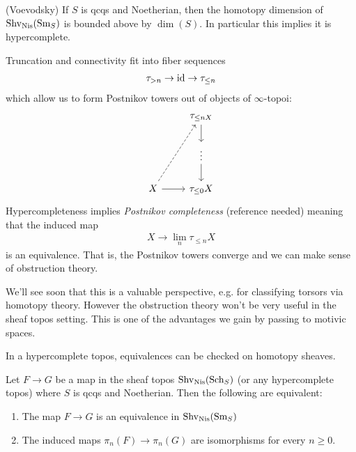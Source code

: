 \documentclass[11pt,openany]{book}
\begin{document}
\begin{theorem} (Voevodsky) If $S$ is qcqs and Noetherian, then the homotopy dimension of $\mathrm{Shv}_{\mathrm{Nis}}(\mathrm{Sm}_S)$ is bounded above by $\dim(S)$. In particular this implies it is hypercomplete.
\end{theorem}

Truncation and connectivity fit into fiber sequences
\begin{equation}\label{eqn:truncation-connectivity-fiber-seq}
\begin{aligned}
    \tau_{>n} \to \mathrm{id} \to \tau_{\le n}
\end{aligned}
\end{equation}
%
which allow us to form Postnikov towers out of objects of $\infty$-topoi:
\[ \begin{tikzcd}
    & \tau_{\le n X}\dar \\
    & \vdots\dar\\
    X\rar\ar[uur,dashed] & \tau_{\le 0} X
\end{tikzcd} \]
Hypercompleteness implies \textit{Postnikov completeness} (reference needed) meaning that the induced map
\begin{align*}
    X \to \lim_n \tau_{\le n} X
\end{align*}
is an equivalence. That is, the Postnikov towers converge and we can make sense of obstruction theory.

We'll see soon that this is a valuable perspective, e.g. for classifying torsors via homotopy theory. However the obstruction theory won't be very useful in the sheaf topos setting. This is one of the advantages we gain by passing to motivic spaces.

\begin{upshot} In a hypercomplete topos, equivalences can be checked on homotopy sheaves.
\end{upshot}

\begin{corollary}\label{cor:equivalence-in-hypercomplete-topos} 
Let $F \to G$ be a map in the sheaf topos $\mathrm{Shv}_{\mathrm{Nis}}(\mathrm{Sch}_S)$ (or any hypercomplete topos) where $S$ is qcqs and Noetherian. Then the following are equivalent:
\begin{enumerate}
    \item The map $F \to G$ is an equivalence in $\mathrm{Shv}_{\mathrm{Nis}}(\mathrm{Sm}_S)$
    \item The induced maps $\pi_n(F) \to \pi_n(G)$ are isomorphisms for every $n\ge 0$.
\end{enumerate}
\end{corollary}
\end{document}
